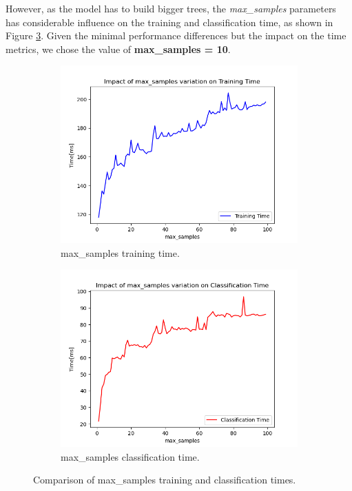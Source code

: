 \documentclass[futureinternet,article,submit,pdftex,moreauthors]{Definitions/mdpi}
\begin{document}
However, as the model has to build bigger trees, the \textit{max\_samples} parameters has considerable influence on the training and classification time, as shown in Figure \ref{fig:max_samples_time_comparison}.
Given the minimal performance differences but the impact on the time metrics, we chose the value of \textbf{max\_samples = 10}. 

\begin{figure}[H]
	\centering
	\begin{subfigure}{0.49\textwidth}
		\centering
		\includegraphics[width=\textwidth]{img/maxSamplesTrainingTime.png}
		\caption{max\_samples training time.}
		\label{fig:max_samples_training_time}
	\end{subfigure}
	\hfill
	\begin{subfigure}{0.49\textwidth}
		\centering
		\includegraphics[width=\textwidth]{img/maxSamplesClassificationTime.png}
		\caption{max\_samples classification time.}
		\label{fig:max_samples_classification_time}
	\end{subfigure}
	\caption{Comparison of max\_samples training and classification times.}
	\label{fig:max_samples_time_comparison}
\end{figure}
\end{document}
